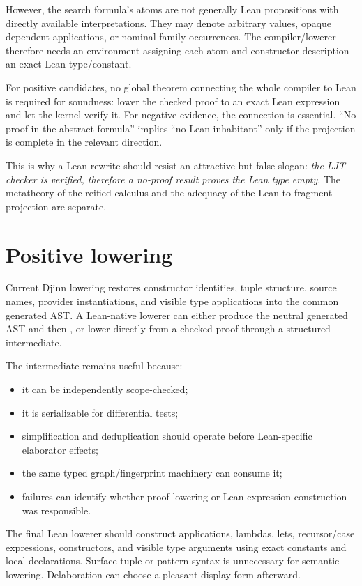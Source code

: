 \documentclass[10pt,letterpaper,oneside]{report}
\newcommand{\code}[1]{\texttt{\detokenize{#1}}}
\begin{document}
However, the search formula's atoms are not generally Lean propositions with directly available interpretations. They may denote arbitrary \code{Sort u} values, opaque dependent applications, or nominal family occurrences. The compiler/lowerer therefore needs an environment assigning each atom and constructor description an exact Lean type/constant.

For positive candidates, no global theorem connecting the whole compiler to Lean is required for soundness: lower the checked proof to an exact Lean expression and let the kernel verify it. For negative evidence, the connection is essential. ``No proof in the abstract formula'' implies ``no Lean inhabitant'' only if the projection is complete in the relevant direction.

This is why a Lean rewrite should resist an attractive but false slogan: \emph{the LJT checker is verified, therefore a no-proof result proves the Lean type empty}. The metatheory of the reified calculus and the adequacy of the Lean-to-fragment projection are separate.

\section{Positive lowering}

Current Djinn lowering restores constructor identities, tuple structure, source names, provider instantiations, and visible type applications into the common generated AST. A Lean-native lowerer can either produce the neutral generated AST and then \code{Expr}, or lower directly from a checked proof through a structured intermediate.

The intermediate remains useful because:

\begin{itemize}
  \item it can be independently scope-checked;
  \item it is serializable for differential tests;
  \item simplification and deduplication should operate before Lean-specific elaborator effects;
  \item the same typed graph/fingerprint machinery can consume it;
  \item failures can identify whether proof lowering or Lean expression construction was responsible.
\end{itemize}

The final Lean lowerer should construct applications, lambdas, lets, recursor/case expressions, constructors, and visible type arguments using exact constants and local declarations. Surface tuple or pattern syntax is unnecessary for semantic lowering. Delaboration can choose a pleasant display form afterward.
\end{document}
